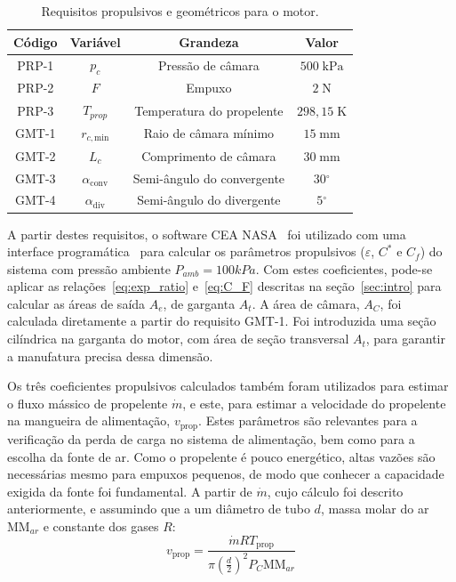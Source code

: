 \begin{table}[htpb]
    \centering\begin{tabular}{cccc} \toprule
        Código & Variável & Grandeza & Valor \\ \midrule
        PRP-1 & \(p_c\) & Pressão de câmara & \(500\;\mathrm{kPa}\) \\
        PRP-2 & \(F\) & Empuxo & \(2\;\mathrm{N}\) \\
        PRP-3 &\(T_{prop}\) & Temperatura do propelente & \(298,15\;\mathrm{K}\) \\
        GMT-1 & \(r_{c,\text{min}}\) & Raio de câmara mínimo & \(15\;\mathrm{mm}\) \\
        GMT-2 & \(L_c\) & Comprimento de câmara & \(30\;\mathrm{mm}\) \\
        GMT-3 & \(\alpha_{\text{conv}}\) & Semi-ângulo do convergente & \(30\mathrm{^\circ} \) \\
        GMT-4 & \(\alpha_{\text{div}}\) & Semi-ângulo do divergente & \(5\mathrm{^\circ} \) \\ \bottomrule 
    \end{tabular}
    \caption{Requisitos propulsivos e geométricos para o motor.}\label{tab:requirements}
\end{table}

A partir destes requisitos, o software CEA NASA~\cite{ceanasa} foi utilizado com uma interface programática~\cite{rocketcea} para calcular os parâmetros propulsivos (\(\varepsilon \), \(C^\ast \) e \(C_f\)) do sistema com pressão ambiente \(P_{amb} = 100kPa\). Com estes coeficientes, pode-se aplicar as relações~\ref{eq:exp_ratio} e~\ref{eq:C_F} descritas na seção~\ref{sec:intro} para calcular as áreas de saída \(A_e\), de garganta \(A_t\). A área de câmara, \(A_C\), foi calculada diretamente a partir do requisito GMT-1. Foi introduzida uma seção cilíndrica na garganta do motor, com área de seção transversal \(A_t\), para garantir a manufatura precisa dessa dimensão.

Os três coeficientes propulsivos calculados também foram utilizados para estimar o fluxo mássico de propelente \(\dot{m}\), e este, para estimar a velocidade do propelente na mangueira de alimentação, \(v_{\text{prop}}\). Estes parâmetros são relevantes para a verificação da perda de carga no sistema de alimentação, bem como para a escolha da fonte de ar. Como o propelente é pouco energético, altas vazões são necessárias mesmo para empuxos pequenos, de modo que conhecer a capacidade exigida da fonte foi fundamental. A partir de \(\dot{m}\), cujo cálculo foi descrito anteriormente, e assumindo que a  um diâmetro de tubo \(d\), massa molar do ar \(\mathrm{MM}_{ar}\) e constante dos gases \(R\):
\begin{equation}
    v_{\text{prop}} = \frac{\dot{m} R T_{\text{prop}}}{\pi {\left(\frac{d}{2}\right)}^2 P_C \mathrm{MM}_{ar}}
\end{equation}

